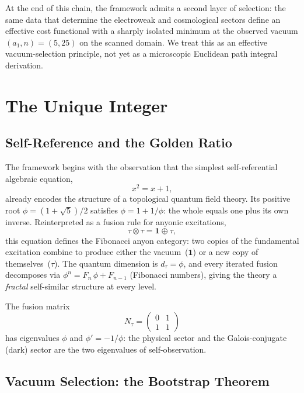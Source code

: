 \documentclass[12pt,a4paper]{article}
\theoremstyle{definition}
\begin{document}
At the end of this chain, the framework admits a second layer of selection: the same data that determine the electroweak and cosmological sectors define an effective cost functional with a sharply isolated minimum at the observed vacuum $(a_1,n) = (5,25)$ on the scanned domain.  We treat this as an effective vacuum-selection principle, not yet as a microscopic Euclidean path integral derivation.


\section{The Unique Integer}
\label{sec:integer}

\subsection{Self-Reference and the Golden Ratio}

The framework begins with the observation that the simplest self-referential algebraic equation,
\[
x^2 = x + 1,
\]
already encodes the structure of a topological quantum field theory.  Its positive root $\phi = (1 + \sqrt{5})/2$ satisfies $\phi = 1 + 1/\phi$: the whole equals one plus its own inverse.  Reinterpreted as a fusion rule for anyonic excitations,
\begin{equation}
\tau \otimes \tau = \mathbf{1} \oplus \tau,
\label{eq:fibonacci_fusion}
\end{equation}
this equation defines the Fibonacci anyon category: two copies of the fundamental excitation combine to produce either the vacuum~($\mathbf{1}$) or a new copy of themselves~($\tau$).  The quantum dimension is $d_\tau = \phi$, and every iterated fusion decomposes via $\phi^n = F_n\,\phi + F_{n-1}$ (Fibonacci numbers), giving the theory a \emph{fractal} self-similar structure at every level.

The fusion matrix
\[
N_\tau = \begin{pmatrix} 0 & 1 \\ 1 & 1 \end{pmatrix}
\]
has eigenvalues $\phi$ and $\phi' = -1/\phi$: the physical sector and the Galois-conjugate (dark) sector are the two eigenvalues of self-observation.

\subsection{Vacuum Selection: the Bootstrap Theorem}
\label{sec:bootstrap}
\end{document}
